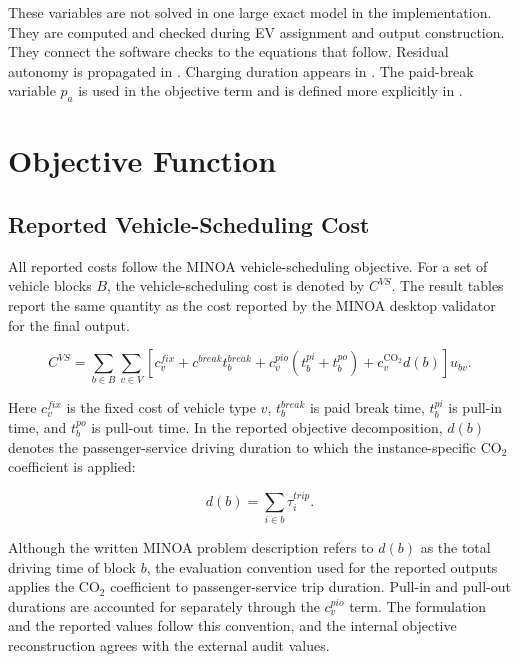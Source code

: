 These variables are not solved in one large exact model in the implementation.
They are computed and checked during EV assignment and output construction.
They connect the software checks to the equations that follow. Residual autonomy
is propagated in . Charging
duration appears in
.
The paid-break variable \(p_a\) is used in the objective term
 and is defined more explicitly in
.

\section{Objective Function}

\subsection{Reported Vehicle-Scheduling Cost}

All reported costs follow the MINOA vehicle-scheduling objective. For a set of
vehicle blocks \(B\), the vehicle-scheduling cost is denoted by
\(C^{VS}\). The result tables report the same quantity as the cost reported by
the MINOA desktop validator for the final output.

\begin{equation}
C^{VS}
=
\sum_{b\in B}
\sum_{v\in V}
\left[
c_v^{fix}
+ c^{break} t^{break}_{b}
+ c_v^{pio}\left(t_b^{pi}+t_b^{po}\right)
+ c_v^{\mathrm{CO}_2}d(b)
\right]u_{bv}.
\label{eq:objective}
\end{equation}

Here \(c_v^{fix}\) is the fixed cost of vehicle type \(v\),
\(t_b^{break}\) is paid break time, \(t_b^{pi}\) is pull-in time, and
\(t_b^{po}\) is pull-out time. In the reported objective decomposition,
\(d(b)\) denotes the passenger-service driving duration to which the
instance-specific CO\(_2\) coefficient is applied:

\begin{equation}
d(b)
=
\sum_{i\in b}\tau_i^{trip}.
\label{eq:model-driving-time}
\end{equation}

Although the written MINOA problem description refers to \(d(b)\) as the total
driving time of block \(b\), the evaluation convention used for the reported
outputs applies the CO\(_2\) coefficient to passenger-service trip duration.
Pull-in and pull-out durations are accounted for separately through the
\(c_v^{pio}\) term. The formulation and the reported values follow this
convention, and the internal objective reconstruction agrees with the external
audit values.

